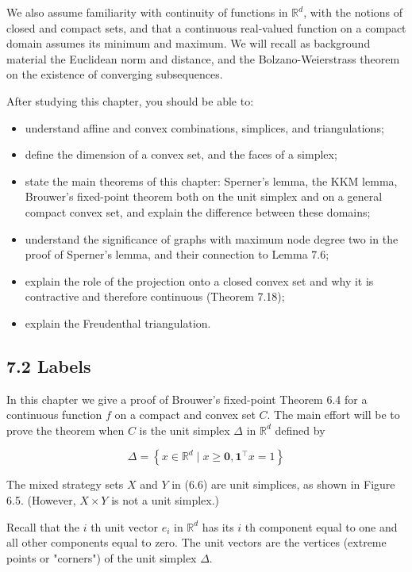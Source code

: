 \documentclass[12pt]{article}
\begin{document}
We also assume familiarity with continuity of functions in $\mathbb{R}^{d}$, with the notions of closed and compact sets, and that a continuous real-valued function on a compact domain assumes its minimum and maximum. We will recall as background material the Euclidean norm and distance, and the Bolzano-Weierstrass theorem on the existence of converging subsequences.

After studying this chapter, you should be able to:

\begin{itemize}
  \item understand affine and convex combinations, simplices, and triangulations;
  \item define the dimension of a convex set, and the faces of a simplex;
  \item state the main theorems of this chapter: Sperner's lemma, the KKM lemma, Brouwer's fixed-point theorem both on the unit simplex and on a general compact convex set, and explain the difference between these domains;
  \item understand the significance of graphs with maximum node degree two in the proof of Sperner's lemma, and their connection to Lemma 7.6;
  \item explain the role of the projection onto a closed convex set and why it is contractive and therefore continuous (Theorem 7.18);
  \item explain the Freudenthal triangulation.
\end{itemize}

\subsection*{7.2 Labels}
In this chapter we give a proof of Brouwer's fixed-point Theorem 6.4 for a continuous function $f$ on a compact and convex set $C$. The main effort will be to prove the theorem when $C$ is the unit simplex $\Delta$ in $\mathbb{R}^{d}$ defined by


\begin{equation*}
\Delta=\left\{x \in \mathbb{R}^{d} \mid x \geq \mathbf{0}, \mathbf{1}^{\top} x=1\right\} \tag{7.1}
\end{equation*}


The mixed strategy sets $X$ and $Y$ in (6.6) are unit simplices, as shown in Figure 6.5. (However, $X \times Y$ is not a unit simplex.)

Recall that the $i$ th unit vector $e_{i}$ in $\mathbb{R}^{d}$ has its $i$ th component equal to one and all other components equal to zero. The unit vectors are the vertices (extreme points or "corners") of the unit simplex $\Delta$.
\end{document}

